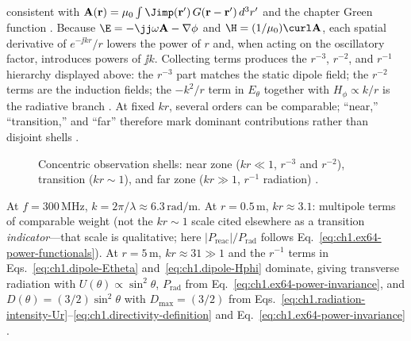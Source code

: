consistent with $\mathbf{A}(\mathbf{r})=\mu_0\int \Jimp(\mathbf{r}')\,G(\mathbf{r}-\mathbf{r}')\,d^{3}r'$ and the chapter Green function \cite{stratton1941,harrington2001,orfanidis2014}. Because $\E=-\jj\omega\mathbf{A}-\nabla\phi$ and $\H=(1/\mu_0)\curl\mathbf{A}$, each spatial derivative of $e^{-\jj kr}/r$ lowers the power of $r$ and, when acting on the oscillatory factor, introduces powers of $\jj k$. Collecting terms produces the $r^{-3}$, $r^{-2}$, and $r^{-1}$ hierarchy displayed above: the $r^{-3}$ part matches the static dipole field; the $r^{-2}$ terms are the induction fields; the $-k^2/r$ term in $E_\theta$ together with $H_\phi\propto k/r$ is the radiative branch \cite{stratton1941}. At fixed $kr$, several orders can be comparable; ``near,'' ``transition,'' and ``far'' therefore mark dominant contributions rather than disjoint shells \cite{stratton1941,poynting1884}.

\begin{figure}[t]
\centering
\VolIPhysFig{\VolIPhysDipoleThreeZones}
\caption{Concentric observation shells: near zone ($kr\ll1$, $r^{-3}$ and $r^{-2}$), transition ($kr\sim1$), and far zone ($kr\gg1$, $r^{-1}$ radiation) \cite{stratton1941,poynting1884}.}
\label{fig:ch1.dipole-three-zones}
\end{figure}

\begin{example}
\label{ex:ch1.dipole-kr}
At $f=300\,\mathrm{MHz}$, $k=2\pi/\lambda\approx6.3\,\mathrm{rad/m}$. At $r=0.5\,\mathrm{m}$, $kr\approx3.1$: multipole terms of comparable weight (not the $kr\sim 1$ scale cited elsewhere as a transition \emph{indicator}---that scale is qualitative; here $|P_{\mathrm{reac}}|/P_{\mathrm{rad}}$ follows Eq.~\eqref{eq:ch1.ex64-power-functionals}). At $r=5\,\mathrm{m}$, $kr\approx31\gg1$ and the $r^{-1}$ terms in Eqs.~\eqref{eq:ch1.dipole-Etheta} and~\eqref{eq:ch1.dipole-Hphi} dominate, giving transverse radiation with $U(\theta)\propto\sin^2\theta$, $P_{\mathrm{rad}}$ from Eq.~\eqref{eq:ch1.ex64-power-invariance}, and $D(\theta)=(3/2)\sin^2\theta$ with $D_{\max}=(3/2)$ from Eqs.~\eqref{eq:ch1.radiation-intensity-Ur}--\eqref{eq:ch1.directivity-definition} and Eq.~\eqref{eq:ch1.ex64-power-invariance} \cite{stratton1941,harrington2001}.
\end{example}

